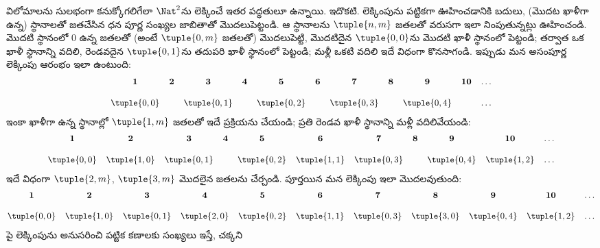 \documentclass[../../../include/open-logic-section]{subfiles}
\begin{document}


\begin{explain}
విలోమాలను సులభంగా కనుక్కోగలిగేలా $\Nat^2$ను లెక్కించే ఇతర
పద్ధతులూ ఉన్నాయి. ఇదొకటి. లెక్కింపును పట్టికగా ఊహించడానికి బదులు,
(మొదట ఖాళీగా ఉన్న) స్థానాలతో జతచేసిన ధన పూర్ణ సంఖ్యల జాబితాతో
మొదలుపెట్టండి. ఆ స్థానాలను $\tuple{n,m}$ జతలతో వరుసగా ఇలా నింపుతున్నట్లు
ఊహించండి. మొదటి స్థానంలో $0$ ఉన్న జతలతో (అంటే $\tuple{0,m}$ జతలతో)
మొదలుపెట్టి, మొదటిదైన $\tuple{0,0}$ను మొదటి ఖాళీ స్థానంలో పెట్టండి;
తర్వాత ఒక ఖాళీ స్థానాన్ని వదిలి, రెండవదైన $\tuple{0,1}$ను తదుపరి
ఖాళీ స్థానంలో పెట్టండి; మళ్లీ ఒకటి వదిలి ఇదే విధంగా కొనసాగండి.
ఇప్పుడు మన అసంపూర్ణ లెక్కింపు ఆరంభం ఇలా ఉంటుంది:
\[\small
\begin{array}{@{}c c c c c c c c c c c@{}}
\mathbf 1 & \mathbf 2 & \mathbf 3 & \mathbf 4 & \mathbf 5 & \mathbf 6 & \mathbf 7 & \mathbf 8 & \mathbf 9 & \mathbf{10} & \dots \\ \\
\tuple{0,0} &  & \tuple{0,1} &  & \tuple{0,2} &  & \tuple{0,3} & & \tuple{0,4} &  & \dots \\
\end{array}
\]
ఇంకా ఖాళీగా ఉన్న స్థానాల్లో $\tuple{1,m}$ జతలతో ఇదే ప్రక్రియను
చేయండి; ప్రతి రెండవ ఖాళీ స్థానాన్ని మళ్లీ వదిలివేయండి:
\[\small
\begin{array}{@{}c c c c c c c c c c c@{}}
\mathbf 1 & \mathbf 2 & \mathbf 3 & \mathbf 4 & \mathbf 5 & \mathbf 6 & \mathbf 7 & \mathbf 8 & \mathbf 9 & \mathbf{10} & \dots \\ \\
\tuple{0,0} & \tuple{1,0} & \tuple{0,1} &  & \tuple{0,2} & \tuple{1,1} &
\tuple{0,3} & & \tuple{0,4} &  \tuple{1,2} & \dots \\
\end{array}
\]
ఇదే విధంగా $\tuple{2,m}$, $\tuple{3,m}$ మొదలైన జతలను చేర్చండి.
పూర్తయిన మన లెక్కింపు ఇలా మొదలవుతుంది:
\[\small
\begin{array}{@{}cc c c c c c c c c c@{}}
\mathbf 1 & \mathbf 2 & \mathbf 3 & \mathbf 4 & \mathbf 5 & \mathbf 6 & \mathbf 7 & \mathbf 8 & \mathbf 9 & \mathbf{10} & \dots \\ \\
\tuple{0,0} & \tuple{1,0} & \tuple{0,1} & \tuple{2,0}  & \tuple{0,2} &
\tuple{1,1} & \tuple{0,3} & \tuple{3,0}  & \tuple{0,4} &  \tuple{1,2} & \dots \\
\end{array}
\]
పై లెక్కింపును అనుసరించి పట్టిక కణాలకు సంఖ్యలు ఇస్తే, చక్కని

\end{explain}
\end{document}
